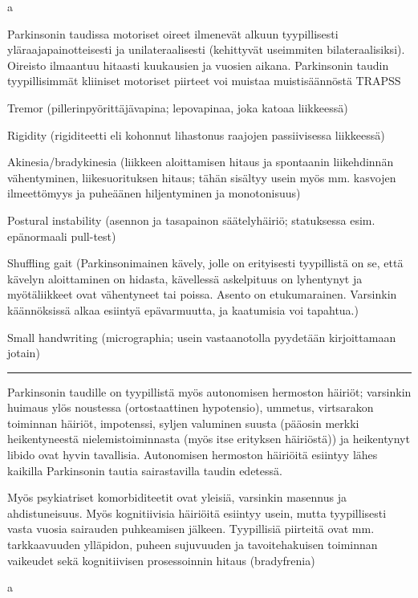 \documentclass[
]{book}
\begin{document}
a

Parkinsonin taudissa motoriset oireet ilmenevät alkuun tyypillisesti yläraajapainotteisesti ja unilateraalisesti (kehittyvät useimmiten bilateraalisiksi). Oireisto ilmaantuu hitaasti kuukausien ja vuosien aikana. Parkinsonin taudin tyypillisimmät kliiniset motoriset piirteet voi muistaa muistisäännöstä TRAPSS

Tremor (pillerinpyörittäjävapina; lepovapinaa, joka katoaa liikkeessä)

Rigidity (rigiditeetti eli kohonnut lihastonus raajojen passiivisessa liikkeessä)

Akinesia/bradykinesia (liikkeen aloittamisen hitaus ja spontaanin liikehdinnän vähentyminen, liikesuorituksen hitaus; tähän sisältyy usein myös mm. kasvojen ilmeettömyys ja puheäänen hiljentyminen ja monotonisuus)

Postural instability (asennon ja tasapainon säätelyhäiriö; statuksessa esim. epänormaali pull-test)

Shuffling gait (Parkinsonimainen kävely, jolle on erityisesti tyypillistä on se, että kävelyn aloittaminen on hidasta, kävellessä askelpituus on lyhentynyt ja myötäliikkeet ovat vähentyneet tai poissa. Asento on etukumarainen. Varsinkin käännöksissä alkaa esiintyä epävarmuutta, ja kaatumisia voi tapahtua.)

Small handwriting (micrographia; usein vastaanotolla pyydetään kirjoittamaan jotain)

\begin{center}\rule{0.5\linewidth}{0.5pt}\end{center}

Parkinsonin taudille on tyypillistä myös autonomisen hermoston häiriöt; varsinkin huimaus ylös noustessa (ortostaattinen hypotensio), ummetus, virtsarakon toiminnan häiriöt, impotenssi, syljen valuminen suusta (pääosin merkki heikentyneestä nielemistoiminnasta (myös itse erityksen häiriöstä)) ja heikentynyt libido ovat hyvin tavallisia. Autonomisen hermoston häiriöitä esiintyy lähes kaikilla Parkinsonin tautia sairastavilla taudin edetessä.

Myös psykiatriset komorbiditeetit ovat yleisiä, varsinkin masennus ja ahdistuneisuus. Myös kognitiivisia häiriöitä esiintyy usein, mutta tyypillisesti vasta vuosia sairauden puhkeamisen jälkeen. Tyypillisiä piirteitä ovat mm. tarkkaavuuden ylläpidon, puheen sujuvuuden ja tavoitehakuisen toiminnan vaikeudet sekä kognitiivisen prosessoinnin hitaus (bradyfrenia)

a
\end{document}
